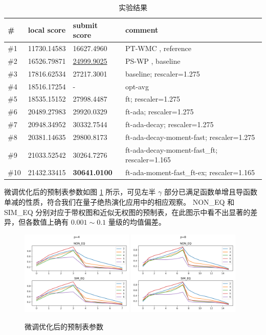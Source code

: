 \documentclass[withoutpreface,bwprint]{cumcmthesis}
\begin{document}
\begin{table}[h!]
	\centering
	\caption{实验结果}
	\begin{tabular}{llll}
		\textbf{\#} & \textbf{local score} & \textbf{submit score} & \textbf{comment} \\
		\hline
		\#1 & 11730.14583 & 16627.4960 &  PT-WMC \cite{Shaydulin2023} , reference  \\
		\#2 & 16526.79871 & \underline{24999.9025} & PS-WP \cite{Sureshbabu2024} , baseline  \\
		\#3 & 17816.62534 & 27217.3001 & baseline; rescaler=1.275  \\
		\#4 & 18516.17254 &         -          & opt-avg  \\
		\#5 & 18535.15152 & 27998.4487 & ft; rescaler=1.275 \\
		\#6 & 20489.27983 & 29920.0329 & ft-ada; rescaler=1.275  \\
		\#7 & 20948.34952 & 30332.7544 & ft-ada-decay; rescaler=1.275  \\
		\#8 & 20381.14635 & 29800.8173 & ft-ada-decay-moment-fast; rescaler=1.275 \\
		\#9 & 21033.52542 & 30264.7276 & ft-ada-decay-moment-fast\_ft; rescaler=1.165  \\
		\#10 & 21432.33415 & \textbf{30641.0100} & ft-ada-moment-fast\_ft-ex; rescaler=1.165 \\
	\end{tabular}
	\label{tbl:result}
\end{table}

微调优化后的预制表参数如图 \ref{fig:theta1} 所示，可见左半 $ \gamma $ 部分已满足函数单增且导函数单减的性质，符合我们在量子绝热演化应用中的相应观察。
NON\_EQ 和 SIM\_EQ 分别对应于带权图和近似无权图的预制表，在此图示中看不出显著的差异，但各数值上确有 $ 0.001 \sim 0.1 $ 量级的均值偏差。

\begin{figure}
	\centering
	{\includegraphics[width=0.48\textwidth]{figures/p=4.png}}
	{\includegraphics[width=0.48\textwidth]{figures/p=8.png}}
	\caption{微调优化后的预制表参数}
	\label{fig:theta1}
\end{figure}
\end{document}
